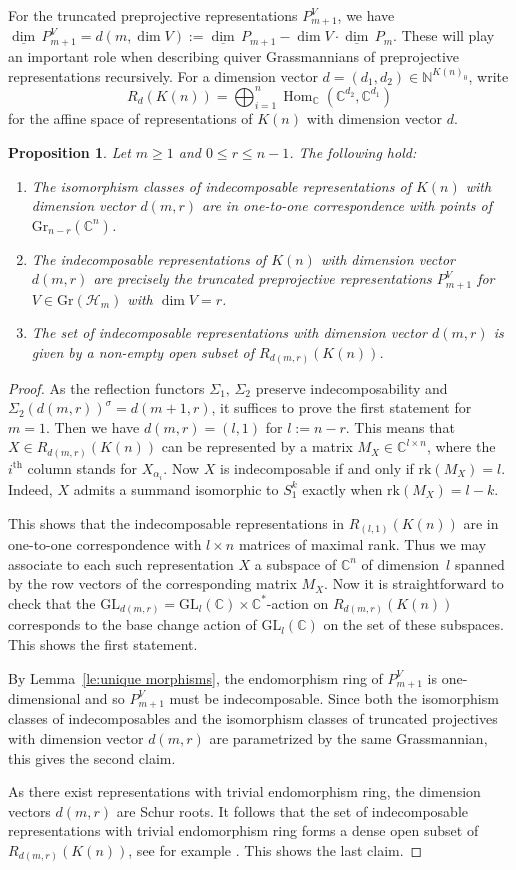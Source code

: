 \documentclass{amsart}
\newtheorem{proposition}[theorem]{Proposition}
\numberwithin{equation}{section}
\newcommand{\CC}{\mathbb{C}}
\newcommand{\NN}{\mathbb{N}}
\newcommand{\cH}{\mathcal{H}}
\newcommand\udim{{\underline{\dim}\, }}
\newcommand{\Gr}{\mathrm{Gr}}
\newcommand{\GL}{\mathrm{GL}}
\newcommand{\Hom}{\operatorname{Hom}}
\newcommand{\rk}{\mathrm{rk}}
\begin{document}
For the truncated preprojective representations $P_{m+1}^V$, we have  $\udim P_{m+1}^V=d(m,\dim V):=\udim P_{m+1}-\dim V\cdot\udim P_m$.
These will play an important role when describing quiver Grassmannians of preprojective representations recursively.
For a dimension vector $d=(d_1,d_2)\in\NN^{K(n)_0}$, write 
\[R_d(K(n))=\bigoplus_{i=1}^n\Hom_{\CC}(\CC^{d_2},\CC^{d_1})\]
for the affine space of representations of $K(n)$ with dimension vector $d$. 
\begin{proposition}
  \label{pro:indecomposables}
  Let $m\geq 1$ and $0\le r\le n-1$.
  The following hold:
  \begin{enumerate}
    \item The isomorphism classes of indecomposable representations of $K(n)$ with dimension vector $d(m,r)$ are in one-to-one correspondence with points of $\Gr_{n-r}(\CC^n)$.
    \item The indecomposable representations of $K(n)$ with dimension vector $d(m,r)$ are precisely the truncated preprojective representations $P_{m+1}^V$ for $V\in \Gr(\cH_m)$ with $\dim V=r$. 
    \item The set of indecomposable representations with dimension vector $d(m,r)$ is given by a non-empty open subset of $R_{d(m,r)}(K(n))$. 
  \end{enumerate}
\end{proposition}
\begin{proof}
  As the reflection functors $\Sigma_1,\,\Sigma_2$ preserve indecomposability and $\Sigma_2(d(m,r))^\sigma=d(m+1,r)$, it suffices to prove the first statement for $m=1$.
  Then we have $d(m,r)=(l,1)$ for $l:=n-r$.
  This means that $X\in R_{d(m,r)}(K(n))$ can be represented by a matrix $M_X\in\CC^{l\times n}$, where the $i^{\mathrm{th}}$ column stands for $X_{\alpha_i}$.
  Now $X$ is indecomposable if and only if $\rk(M_X)=l$.
  Indeed, $X$ admits a summand isomorphic to $S_1^k$ exactly when $\rk(M_X)=l-k$.

  This shows that the indecomposable representations in $R_{(l,1)}(K(n))$ are in one-to-one correspondence with $l\times n$ matrices of maximal rank.
  Thus we may associate to each such representation $X$ a subspace of $\CC^n$ of dimension~$l$ spanned by the row vectors of the corresponding matrix $M_X$.
  Now it is straightforward to check that the $\GL_{d(m,r)}=\GL_l(\CC)\times\CC^\ast$-action on $R_{d(m,r)}(K(n))$ corresponds to the base change action of $\GL_l(\CC)$ on the set of these subspaces.
  This shows the first statement.

  By Lemma~\ref{le:unique morphisms}, the endomorphism ring of $P_{m+1}^V$ is one-dimensional and so $P_{m+1}^V$ must be indecomposable.
  Since both the isomorphism classes of indecomposables and the isomorphism classes of truncated projectives with dimension vector $d(m,r)$ are parametrized by the same Grassmannian, this gives the second claim.

  As there exist representations with trivial endomorphism ring, the dimension vectors $d(m,r)$ are Schur roots.
  It follows that the set of indecomposable representations with trivial endomorphism ring forms a dense open subset of $R_{d(m,r)}(K(n))$, see for example \cite[Theorem 2.2]{sch}.
  This shows the last claim.
\end{proof}
\end{document}
